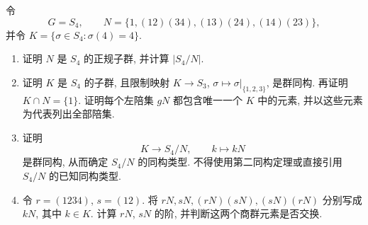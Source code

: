 \documentclass{article}
\begin{document}
\begin{problem}
令
\[
  G=S_4,\qquad N=\{1,(12)(34),(13)(24),(14)(23)\},
\]
并令 $K=\{\sigma\in S_4:\sigma(4)=4\}$.
\begin{enumerate}
  \item[(a)] 证明 $N$ 是 $S_4$ 的正规子群, 并计算 $|S_4/N|$.
  \item[(b)] 证明 $K$ 是 $S_4$ 的子群, 且限制映射 $K\to S_3$, $\sigma\mapsto\sigma|_{\{1,2,3\}}$, 是群同构. 再证明 $K\cap N=\{1\}$. 证明每个左陪集 $gN$ 都包含唯一一个 $K$ 中的元素, 并以这些元素为代表列出全部陪集.
  \item[(c)] 证明
  \[
    K\longrightarrow S_4/N,\qquad k\longmapsto kN
  \]
  是群同构, 从而确定 $S_4/N$ 的同构类型. 不得使用第二同构定理或直接引用 $S_4/N$ 的已知同构类型.
  \item[(d)] 令 $r=(1234)$, $s=(12)$. 将 $rN,sN,(rN)(sN),(sN)(rN)$ 分别写成 $kN$, 其中 $k\in K$. 计算 $rN$, $sN$ 的阶, 并判断这两个商群元素是否交换.
\end{enumerate}
\end{problem}
\end{document}
